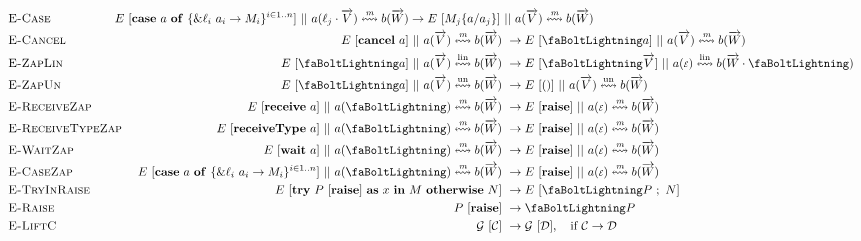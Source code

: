 \documentclass[a4paper,11pt]{article}
\newcommand{\zap}{\text{\faBoltLightning}}
\newcommand{\un}{\text{un}}
\newcommand{\lin}{\text{lin}}
\newcommand{\mbf}[1]{\mathbf{#1}}
\newcommand{\receive}{\mbf{receive}}
\newcommand{\wait}{\mbf{wait}}
\newcommand{\receiveType}{\mbf{receiveType}}
\newcommand{\caseLabel}[5]{\mbf{case}~#4~\mbf{of}~\{\&#3_#1~#4_#1 \rightarrow #5_#1\}^{#1 \in 1..#2}}
\newcommand{\cancel}{\mbf{cancel}}
\newcommand{\rraise}{\mbf{raise}}
\newcommand{\tryin}[4]{\mbf{try}~#1~\mbf{as}~#2~\mbf{in}~#3~\mbf{otherwise}~#4}
\newcommand{\mcal}[1]{\mathcal{#1}}
\newcommand{\C}{\mcal{C}}
\newcommand{\D}{\mcal{D}}
\newcommand{\G}{\mcal{G}}
\newcommand{\m}{\textit{\text{m}}}
\newcommand{\run}[2]{#1~[#2]}
\newcommand{\toparrow}[1]{\overrightarrow{#1}}
\newcommand{\vv}{\toparrow{V}}
\newcommand{\ww}{\toparrow{W}}
\newcommand{\buf}[5]{#1(#2) \overset{#3}{\leftrightsquigarrow} #4(#5)}
\newcommand{\lbl}{\ell}
\newcommand{\empt}{\scalerel*{\mcal{E}}{\epsilon}}
\newcommand{\rrule}[1]{\textsc{\text{#1}}}
\theoremstyle{plain}
\theoremstyle{nonumberplain}
\begin{document}
\begin{align*}
  & \rrule{E-Case} \qquad\qquad\quad~ \lefteqn{\run{E}{\caseLabel{i}{n}{\lbl}{a}{M}}~||~\buf{a}{\lbl_j \cdot \vv}{\m}{b}{\ww} \rightarrow \run{E}{M_j\{a/a_j\}}~||~\buf{a}{\vv}{\m}{b}{\ww}}                                                                           \\
  & \rrule{E-Cancel}         &~ \run{E}{\cancel~a}~||~\buf{a}{\vv}{\m}{b}{\ww}                                             &~ \rightarrow \run{E}{\zap a}~||~\buf{a}{\vv}{\m}{b}{\ww}                                                                                  \\
  & \rrule{E-ZapLin}         &~ \run{E}{\zap a}~||~\buf{a}{\vv}{\lin}{b}{\ww}                                              &~ \rightarrow \run{E}{\zap\vv}~||~\buf{a}{\empt}{\lin}{b}{\ww \cdot \zap}                                                                  \\
  & \rrule{E-ZapUn}          &~ \run{E}{\zap a}~||~\buf{a}{\vv}{\un}{b}{\ww}                                               &~ \rightarrow \run{E}{()}~||~\buf{a}{\vv}{\un}{b}{\ww}                                                                                     \\
  & \rrule{E-ReceiveZap}     &~ \run{E}{\receive~a}~||~\buf{a}{\zap}{\m}{b}{\ww}                                           &~ \rightarrow \run{E}{\rraise}~||~\buf{a}{\empt}{\m}{b}{\ww}                                                                               \\
  & \rrule{E-ReceiveTypeZap} &~ \run{E}{\receiveType~a}~||~\buf{a}{\zap}{\m}{b}{\ww}                                       &~ \rightarrow \run{E}{\rraise}~||~\buf{a}{\empt}{\m}{b}{\ww}                                                                               \\
  & \rrule{E-WaitZap}        &~ \run{E}{\wait~a}~||~\buf{a}{\zap}{\m}{b}{\ww}                                              &~ \rightarrow \run{E}{\rraise}~||~\buf{a}{\empt}{\m}{b}{\ww}                                                                               \\
  & \rrule{E-CaseZap}        &~ \run{E}{\caseLabel{i}{n}{\lbl}{a}{M}}~||~\buf{a}{\zap}{\m}{b}{\ww}                         &~ \rightarrow \run{E}{\rraise}~||~\buf{a}{\empt}{\m}{b}{\ww}                                                                               \\
  & \rrule{E-TryInRaise}     &~ \run{E}{\tryin{\run{P}{\rraise}}{x}{M}{N}}                                                 &~ \rightarrow \run{E}{\zap P~;~N}                                                                                                          \\
  & \rrule{E-Raise}          &~ \run{P}{\rraise}                                                                           &~ \rightarrow \zap P                                                                                                                       \\
  & \rrule{E-LiftC}          &~ \run{\G}{\C}                                                                               &~ \rightarrow \run{\G}{\D}, \quad \text{if}~\C \rightarrow \D
\end{align*}
\end{document}
